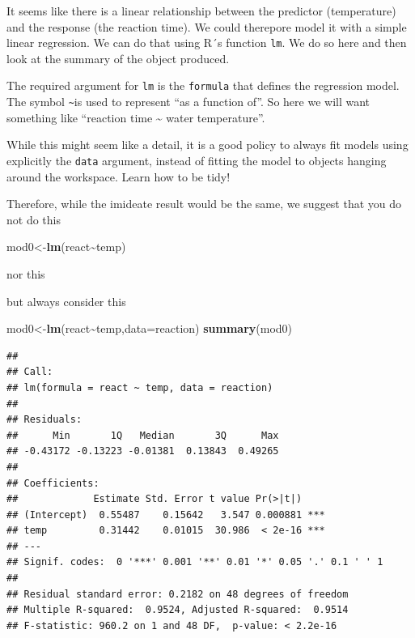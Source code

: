 \documentclass[
]{book}
\newenvironment{Shaded}{\begin{snugshade}}{\end{snugshade}}
\newcommand{\AttributeTok}[1]{\textcolor[rgb]{0.13,0.29,0.53}{#1}}
\newcommand{\FunctionTok}[1]{\textcolor[rgb]{0.13,0.29,0.53}{\textbf{#1}}}
\newcommand{\NormalTok}[1]{#1}
\newcommand{\OtherTok}[1]{\textcolor[rgb]{0.56,0.35,0.01}{#1}}
\newcommand{\SpecialCharTok}[1]{\textcolor[rgb]{0.81,0.36,0.00}{\textbf{#1}}}
\begin{document}
It seems like there is a linear relationship between the predictor (temperature) and the response (the reaction time). We could therepore model it with a simple linear regression. We can do that using R´s function \texttt{lm}. We do so here and then look at the summary of the object produced.

The required argument for \texttt{lm} is the \texttt{formula} that defines the regression model. The symbol \texttt{\textasciitilde{}}is used to represent ``as a function of''. So here we will want something like ``reaction time \textasciitilde{} water temperature''.

While this might seem like a detail, it is a good policy to always fit models using explicitly the \texttt{data} argument, instead of fitting the model to objects hanging around the workspace. Learn how to be tidy!

Therefore, while the imideate result would be the same, we suggest that you do not do this

\begin{Shaded}
\begin{Highlighting}[]
\NormalTok{mod0}\OtherTok{\textless{}{-}}\FunctionTok{lm}\NormalTok{(react}\SpecialCharTok{\textasciitilde{}}\NormalTok{temp)}
\end{Highlighting}
\end{Shaded}

nor this

\begin{Shaded}
\end{Shaded}

but always consider this

\begin{Shaded}
\begin{Highlighting}[]
\NormalTok{mod0}\OtherTok{\textless{}{-}}\FunctionTok{lm}\NormalTok{(react}\SpecialCharTok{\textasciitilde{}}\NormalTok{temp,}\AttributeTok{data=}\NormalTok{reaction)}
\FunctionTok{summary}\NormalTok{(mod0)}
\end{Highlighting}
\end{Shaded}

\begin{verbatim}
## 
## Call:
## lm(formula = react ~ temp, data = reaction)
## 
## Residuals:
##      Min       1Q   Median       3Q      Max 
## -0.43172 -0.13223 -0.01381  0.13843  0.49265 
## 
## Coefficients:
##             Estimate Std. Error t value Pr(>|t|)    
## (Intercept)  0.55487    0.15642   3.547 0.000881 ***
## temp         0.31442    0.01015  30.986  < 2e-16 ***
## ---
## Signif. codes:  0 '***' 0.001 '**' 0.01 '*' 0.05 '.' 0.1 ' ' 1
## 
## Residual standard error: 0.2182 on 48 degrees of freedom
## Multiple R-squared:  0.9524, Adjusted R-squared:  0.9514 
## F-statistic: 960.2 on 1 and 48 DF,  p-value: < 2.2e-16
\end{verbatim}
\end{document}
